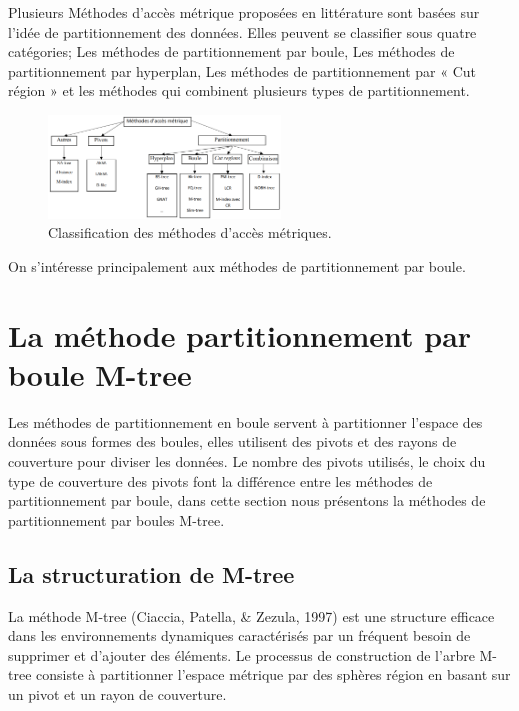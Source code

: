 Plusieurs Méthodes d’accès métrique proposées en littérature sont basées sur l’idée de partitionnement des données. Elles peuvent se classifier sous quatre catégories; Les méthodes de partitionnement par boule, Les méthodes de partitionnement par hyperplan, Les méthodes de partitionnement par « Cut région » et les méthodes qui combinent plusieurs types de
partitionnement.
\begin{figure}[H]
	\centering
	\includegraphics[width=0.55\textwidth]{Figures/class.png} %
	\caption{ Classification des méthodes d’accès métriques.}
\end{figure}
On s'intéresse principalement aux méthodes de partitionnement par boule.

\section{La méthode partitionnement par boule M-tree}
Les méthodes de partitionnement en boule servent à partitionner l'espace des données sous formes des boules, elles utilisent des pivots et des rayons de couverture pour diviser les données. Le nombre des pivots utilisés, le choix du type de couverture des pivots font la différence entre les méthodes de partitionnement par boule, dans cette section nous présentons la méthodes de partitionnement par boules M-tree.\\

\subsection{La structuration de M-tree}
La méthode M-tree (Ciaccia, Patella, \& Zezula, 1997) est une structure efficace dans les environnements dynamiques caractérisés par un fréquent besoin de supprimer et d'ajouter des éléments. Le processus de construction de l'arbre M-tree consiste à partitionner l'espace métrique par des sphères région en basant sur un pivot et un rayon de couverture. \\


